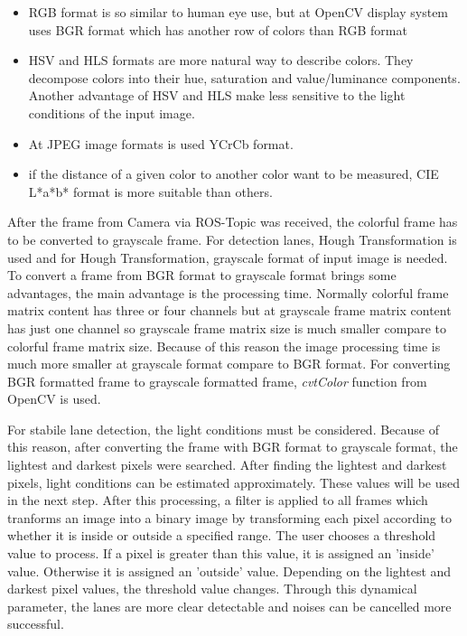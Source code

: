 \begin{itemize}

\item RGB format is so similar to human eye use, but at OpenCV display system uses BGR format which has another row of colors than RGB format  

\item HSV and HLS formats are more natural way to describe colors. They decompose colors into their hue, saturation and value/luminance components. Another advantage of HSV and HLS make less sensitive to the light conditions of the input image.

\item At JPEG image formats is used YCrCb format.

\item if the distance of a given color to another color want to be measured, CIE L*a*b* format is more suitable than others.

\end{itemize}

After the frame from Camera via ROS-Topic was received, the colorful frame has to be converted to grayscale frame. For detection lanes, Hough Transformation is used and for Hough Transformation, grayscale format of input image is needed. To convert a frame from BGR format to grayscale format brings some advantages, the main advantage is the processing time. Normally colorful frame matrix content has three or four channels but at grayscale frame matrix content has just one channel so grayscale frame matrix size is much smaller compare to colorful frame matrix size. Because of this reason the image processing time is much more smaller at grayscale format compare to BGR format. For converting BGR formatted frame to grayscale formatted frame, \textit{cvtColor} function from OpenCV is used.

 For stabile lane detection, the light conditions must be considered. Because of this reason, after converting the frame with BGR format to grayscale format, the lightest and darkest pixels were searched. After finding the lightest and darkest pixels, light conditions can be estimated approximately. These values will be used in the next step. After this processing, a filter is applied to all frames which tranforms an image into a binary image by transforming each pixel according to whether it is inside or outside a specified range. The user chooses a threshold value to process. If a pixel is greater than this value, it is assigned an 'inside' value. Otherwise it is assigned an 'outside' value. Depending on the lightest and darkest pixel values, the threshold value changes. Through this dynamical parameter, the lanes are more clear detectable and noises can be cancelled more successful.

